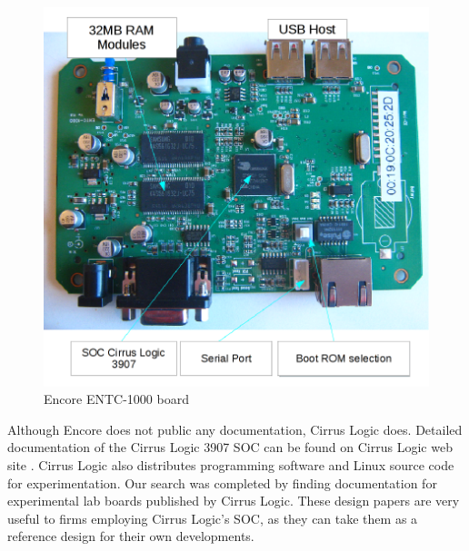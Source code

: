 \documentclass[conference]{IEEEtran}
\newcommand{\nota}[1]{}
\begin{document}
\begin{figure}
\begin{center}
\includegraphics[scale=0.40]{placa-encore-en.png}
\caption{Encore ENTC-1000 board}
\label{fig:placa-encore}
\end{center}
\end{figure}
\nota{
Afortunadamente para nuestra investigación,
la empresa Cirrus publica documentación detallada del SOC Cirrus 3907A \cite{cirrus}.
Junto con esta documentación Cirrus también publica software
para su programación, y código fuente de
Linux para experimentación. Completando la búsqueda, hemos encontrado
documentación de placas de laboratorios experimentales, que la fabrica Cirrus publica.
Estos diseños son muy útiles a las empresas que utilizan el SOC de Cirrus,
ya que lo pueden tomar como diseño de referencia para sus circuitos particulares.
}

Although Encore does not public any documentation, Cirrus Logic does. Detailed documentation of the Cirrus Logic 3907 SOC can be found on Cirrus Logic web site \cite{cirrus}. Cirrus Logic also distributes programming software and Linux source code for experimentation. Our search was completed by finding documentation for experimental lab boards published by Cirrus Logic. These design papers are very useful to firms employing Cirrus Logic's SOC, as they can take them as a reference design for their own developments.
\end{document}
